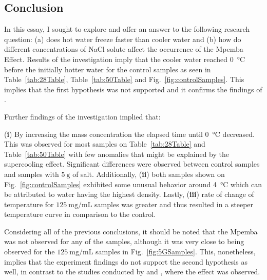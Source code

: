 \documentclass[../main.tex]{subfiles}
\begin{document}
\doublespacing

\subsection{Conclusion}

In this essay, I sought to explore and offer an answer to the following research question: (a) does hot water freeze faster than cooler water and (b) how do different concentrations of NaCl solute affect the occurrence of the Mpemba Effect. Results of the investigation imply that the cooler water reached \SI{0}{\celsius} before the initially hotter water for the control samples as seen in Table~\ref{tab:28Table}, Table~\ref{tab:50Table} and Fig.~\ref{fig:controlSamples}. This implies that the first hypothesis was not supported and it confirms the findings of \textcite{burridge_questioning_2016}. \par 
Further findings of the investigation implied that:  \par
(\textbf{i}) By increasing the mass concentration the elapsed time until \SI{0}{\celsius} decreased. This was observed for most samples on Table~\ref{tab:28Table} and Table~\ref{tab:50Table} with few anomalies that might be explained by the supercooling effect. Significant differences were observed between control samples and samples with $\SI{5}{\gram}$ of salt. Additionally, (\textbf{ii}) both samples shown on Fig.~\ref{fig:controlSamples} exhibited some unusual behavior around \SI{4}{\celsius} which can be attributed to water having the highest density. Lastly, (\textbf{iii}) rate of change of temperature for $\SI{125}{\milli\gram\per\milli\liter}$ samples was greater and thus resulted in a steeper temperature curve in comparison to the control. \par

Considering all of the previous conclusions, it should be noted that the Mpemba was not observed for any of the samples, although it was very close to being observed for the $\SI{125}{\milli\gram\per\milli\liter}$ samples in Fig.~\ref{fig:5GSamples}. This, nonetheless, implies that the experiment findings do not support the second hypothesis as well, in contrast to the studies conducted by \textcite{ibekwe_investigating_2016} and \textcite{katz_when_2009}, where the effect was observed.  \par
\end{document}
